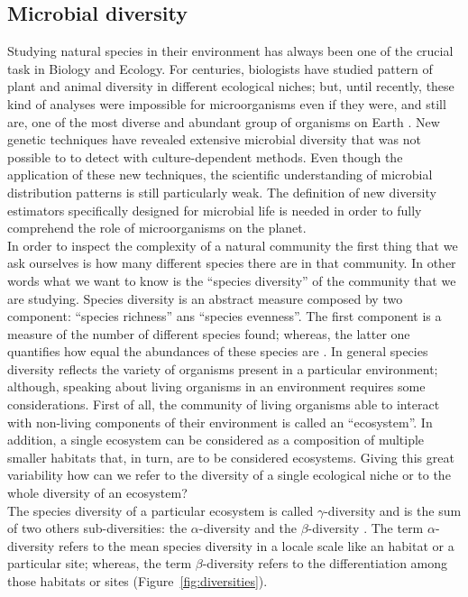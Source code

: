 \subsection{Microbial diversity}
Studying natural species in their environment has always been one of the crucial task in Biology and Ecology. For centuries, biologists have studied pattern of plant and animal diversity in different ecological niches; but, until recently, these kind of analyses were impossible for microorganisms even if they were, and still are, one of the most diverse and abundant group of organisms on Earth \cite{curtis2005exploring}. New genetic techniques have revealed extensive microbial diversity that was not possible to to detect with culture-dependent methods. Even though the application of these new techniques, the scientific understanding of microbial distribution patterns is still particularly weak. The definition of new diversity estimators specifically designed for microbial life is needed in order to fully comprehend the role of microorganisms on the planet.\\
In order to inspect the complexity of a natural community the first thing that we ask ourselves is how many different species there are in that community. In other words what we want to know is the ``species diversity'' of the community that we are studying. Species diversity is an abstract measure composed by two component: ``species richness'' ans ``species evenness''. The first component is a measure of the number of different species found; whereas, the latter one quantifies how equal the abundances of these species are \cite{hill1973diversity}. In general species diversity reflects the variety of organisms present in a particular environment; although, speaking about living organisms in an environment requires some considerations. First of all, the community of living organisms able to interact with non-living components of their environment is called an ``ecosystem''. In addition, a single ecosystem can be considered as a composition of multiple smaller habitats that, in turn, are to be considered ecosystems. Giving this great variability how can we refer to the diversity of a single ecological niche or to the whole diversity of an ecosystem?\\
The species diversity of a particular ecosystem is called $\gamma$-diversity and is the sum of two others sub-diversities: the $\alpha$-diversity and the $\beta$-diversity \cite{whittaker1960vegetation}. The term $\alpha$-diversity refers to the mean species diversity in a locale scale like an habitat or a particular site; whereas, the term $\beta$-diversity refers to the differentiation among those habitats or sites (Figure~\ref{fig:diversities}). 
